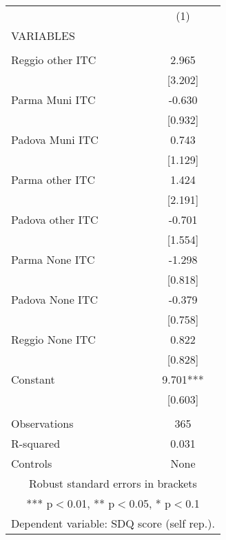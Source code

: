 \begin{tabular}{lc} \hline
 & (1) \\
VARIABLES &  \\ \hline
 &  \\
Reggio other ITC & 2.965 \\
 & [3.202] \\
Parma Muni ITC & -0.630 \\
 & [0.932] \\
Padova Muni ITC & 0.743 \\
 & [1.129] \\
Parma other ITC & 1.424 \\
 & [2.191] \\
Padova other ITC & -0.701 \\
 & [1.554] \\
Parma None ITC & -1.298 \\
 & [0.818] \\
Padova None ITC & -0.379 \\
 & [0.758] \\
Reggio None ITC & 0.822 \\
 & [0.828] \\
Constant & 9.701*** \\
 & [0.603] \\
 &  \\
Observations & 365 \\
R-squared & 0.031 \\
 Controls & None \\ \hline
\multicolumn{2}{c}{ Robust standard errors in brackets} \\
\multicolumn{2}{c}{ *** p$<$0.01, ** p$<$0.05, * p$<$0.1} \\
\multicolumn{2}{c}{ Dependent variable: SDQ score (self rep.).} \\
\end{tabular}
